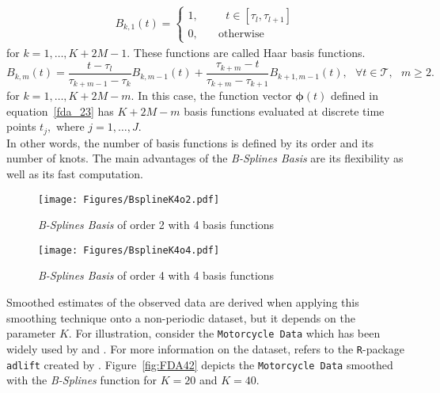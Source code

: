 \begin{eqnarray}
B_{k,1}(t) = \left\{ 
\begin{array}{cc}
1, & \quad \textrm{ } t\in [\tau_{l},\tau_{l+1}]\\
0, & \quad \textrm{otherwise}
\end{array}\right.
\end{eqnarray}
for $k = 1,\dots,K+2M-1$. These functions are called Haar basis functions. 
\begin{equation}
B_{k,m}(t)=\frac{t-\tau_{l}}{\tau_{k+m-1}-\tau_{k}}B_{k,m-1}(t)+\frac{\tau_{k+m}-t}{\tau_{k+m}-\tau_{k+1}}B_{k+1,m-1}(t),\text{ }\forall t \in \mathcal{T},\text{ } m \geq 2 .
\end{equation} for $k = 1,\dots,K+2M-m$.
In this case, the function vector $\bm{\phi}(t)$ defined in equation~\eqref{fda_23} has $K+2M-m$ basis functions evaluated at discrete time points $t_{j}, \text{ where }j=1,\dots,J$. \\In other words, the number of basis functions is defined by its order and its number of knots. The main advantages of the \textit{B-Splines Basis} are its flexibility as well as its fast computation.

\begin{figure}[h]
  \centering
    \texttt{[image: Figures/BsplineK4o2.pdf]}
  \caption[\textit{B-Splines Basis} of order 2 with 4 basis functions]{\textit{B-Splines Basis} of order 2 with 4 basis functions}
  \label{fig:FDA3}
\end{figure}

\begin{figure}[h]
  \centering
    \texttt{[image: Figures/BsplineK4o4.pdf]}
  \caption[\textit{B-Splines Basis} of order 4 with 4 basis functions]{\textit{B-Splines Basis} of order 4 with 4 basis functions}
  \label{fig:FDA41}
\end{figure}
\clearpage

Smoothed estimates of the observed data are derived when applying this smoothing technique onto a non-periodic dataset, but it depends on the parameter $K$. For illustration, consider the \texttt{Motorcycle Data} which has been widely used by \citet{Silverman1985} and \citet{Hardle94}. For more information on the dataset, refers to the \texttt{R}-package \texttt{adlift} created by \cite{Motordata}. Figure~\ref{fig:FDA42} depicts the \texttt{Motorcycle Data} smoothed with the \textit{B-Splines} function for $K = 20$ and $K = 40$. 

